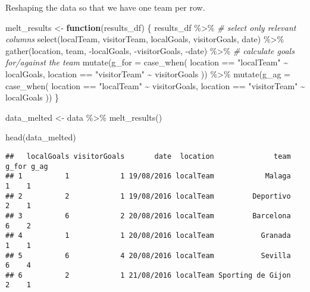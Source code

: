 \documentclass[
]{article}
\newenvironment{Shaded}{\begin{snugshade}}{\end{snugshade}}
\newcommand{\AttributeTok}[1]{\textcolor[rgb]{0.77,0.63,0.00}{#1}}
\newcommand{\CommentTok}[1]{\textcolor[rgb]{0.56,0.35,0.01}{\textit{#1}}}
\newcommand{\ControlFlowTok}[1]{\textcolor[rgb]{0.13,0.29,0.53}{\textbf{#1}}}
\newcommand{\FunctionTok}[1]{\textcolor[rgb]{0.00,0.00,0.00}{#1}}
\newcommand{\NormalTok}[1]{#1}
\newcommand{\OtherTok}[1]{\textcolor[rgb]{0.56,0.35,0.01}{#1}}
\newcommand{\SpecialCharTok}[1]{\textcolor[rgb]{0.00,0.00,0.00}{#1}}
\newcommand{\StringTok}[1]{\textcolor[rgb]{0.31,0.60,0.02}{#1}}
\begin{document}
Reshaping the data so that we have one team per row.

\begin{Shaded}
\begin{Highlighting}[]
\NormalTok{melt\_results }\OtherTok{\textless{}{-}} \ControlFlowTok{function}\NormalTok{(results\_df) \{}
\NormalTok{  results\_df }\SpecialCharTok{\%\textgreater{}\%}
    \CommentTok{\# select only relevant columns}
    \FunctionTok{select}\NormalTok{(localTeam, visitorTeam, localGoals, visitorGoals, date) }\SpecialCharTok{\%\textgreater{}\%}
    \FunctionTok{gather}\NormalTok{(location, team,  }\SpecialCharTok{{-}}\NormalTok{localGoals, }\SpecialCharTok{{-}}\NormalTok{visitorGoals, }\SpecialCharTok{{-}}\NormalTok{date) }\SpecialCharTok{\%\textgreater{}\%}
    \CommentTok{\# calculate goals for/against the team}
    \FunctionTok{mutate}\NormalTok{(}\AttributeTok{g\_for =} \FunctionTok{case\_when}\NormalTok{(}
\NormalTok{      location }\SpecialCharTok{==} \StringTok{"localTeam"} \SpecialCharTok{\textasciitilde{}}\NormalTok{ localGoals,}
\NormalTok{      location }\SpecialCharTok{==} \StringTok{"visitorTeam"} \SpecialCharTok{\textasciitilde{}}\NormalTok{ visitorGoals}
\NormalTok{    )) }\SpecialCharTok{\%\textgreater{}\%}
    \FunctionTok{mutate}\NormalTok{(}\AttributeTok{g\_ag =} \FunctionTok{case\_when}\NormalTok{(}
\NormalTok{      location }\SpecialCharTok{==} \StringTok{"localTeam"} \SpecialCharTok{\textasciitilde{}}\NormalTok{ visitorGoals,}
\NormalTok{      location }\SpecialCharTok{==} \StringTok{"visitorTeam"} \SpecialCharTok{\textasciitilde{}}\NormalTok{ localGoals}
\NormalTok{    )) }
\NormalTok{\}}

\NormalTok{data\_melted }\OtherTok{\textless{}{-}}\NormalTok{ data }\SpecialCharTok{\%\textgreater{}\%}
  \FunctionTok{melt\_results}\NormalTok{()}

\FunctionTok{head}\NormalTok{(data\_melted)}
\end{Highlighting}
\end{Shaded}

\begin{verbatim}
##   localGoals visitorGoals       date  location              team g_for g_ag
## 1          1            1 19/08/2016 localTeam            Malaga     1    1
## 2          2            1 19/08/2016 localTeam         Deportivo     2    1
## 3          6            2 20/08/2016 localTeam         Barcelona     6    2
## 4          1            1 20/08/2016 localTeam           Granada     1    1
## 5          6            4 20/08/2016 localTeam           Sevilla     6    4
## 6          2            1 21/08/2016 localTeam Sporting de Gijon     2    1
\end{verbatim}
\end{document}
